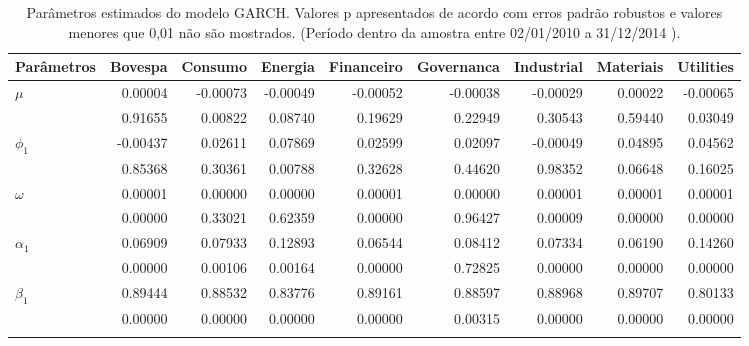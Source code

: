 \begin{longtable}{lrrrrrrrr}
\caption{Par\^ametros estimados do modelo GARCH. Valores p apresentados de acordo 
com erros padrão robustos e valores menores que 0,01 não são mostrados. (Período 
             dentro da amostra entre 02/01/2010 a 31/12/2014 ).} \\ 
  \toprule
Parâmetros & Bovespa & Consumo & Energia & Financeiro & Governanca & Industrial & Materiais & Utilities \\ 
  \midrule
$\mu$ & 0.00004 & -0.00073 & -0.00049 & -0.00052 & -0.00038 & -0.00029 & 0.00022 & -0.00065 \\ 
   & 0.91655 & 0.00822 & 0.08740 & 0.19629 & 0.22949 & 0.30543 & 0.59440 & 0.03049 \\ 
  $\phi_1$ & -0.00437 & 0.02611 & 0.07869 & 0.02599 & 0.02097 & -0.00049 & 0.04895 & 0.04562 \\ 
   & 0.85368 & 0.30361 & 0.00788 & 0.32628 & 0.44620 & 0.98352 & 0.06648 & 0.16025 \\ 
  $\omega$ & 0.00001 & 0.00000 & 0.00000 & 0.00001 & 0.00000 & 0.00001 & 0.00001 & 0.00001 \\ 
   & 0.00000 & 0.33021 & 0.62359 & 0.00000 & 0.96427 & 0.00009 & 0.00000 & 0.00000 \\ 
  $\alpha_1$ & 0.06909 & 0.07933 & 0.12893 & 0.06544 & 0.08412 & 0.07334 & 0.06190 & 0.14260 \\ 
   & 0.00000 & 0.00106 & 0.00164 & 0.00000 & 0.72825 & 0.00000 & 0.00000 & 0.00000 \\ 
  $\beta_1$ & 0.89444 & 0.88532 & 0.83776 & 0.89161 & 0.88597 & 0.88968 & 0.89707 & 0.80133 \\ 
   & 0.00000 & 0.00000 & 0.00000 & 0.00000 & 0.00315 & 0.00000 & 0.00000 & 0.00000 \\ 
   \bottomrule
\label{tab:garchcoef}
\end{longtable}

